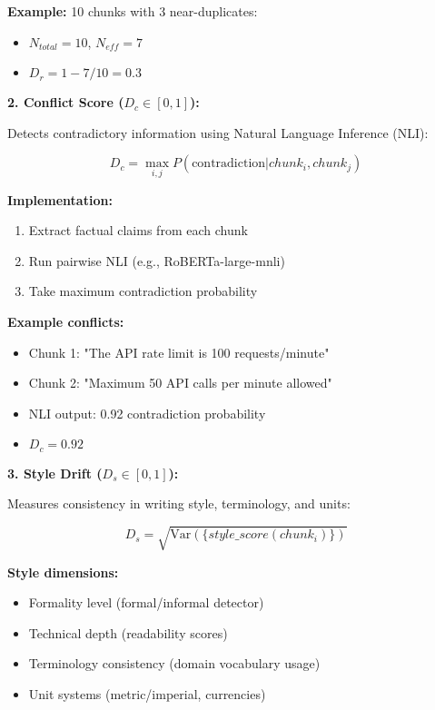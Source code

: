 \documentclass[conference]{IEEEtran}
\begin{document}
\textbf{Example:} 10 chunks with 3 near-duplicates:
\begin{itemize}
\item $N_{total} = 10$, $N_{eff} = 7$
\item $D_r = 1 - 7/10 = 0.3$
\end{itemize}

\textbf{2. Conflict Score ($D_c \in [0,1]$):}

Detects contradictory information using Natural Language Inference (NLI):

\begin{equation}
D_c = \max_{i,j} P(\text{contradiction} | chunk_i, chunk_j)
\end{equation}

\textbf{Implementation:}
\begin{enumerate}
\item Extract factual claims from each chunk
\item Run pairwise NLI (e.g., RoBERTa-large-mnli)
\item Take maximum contradiction probability
\end{enumerate}

\textbf{Example conflicts:}
\begin{itemize}
\item Chunk 1: "The API rate limit is 100 requests/minute"
\item Chunk 2: "Maximum 50 API calls per minute allowed"
\item NLI output: 0.92 contradiction probability
\item $D_c = 0.92$
\end{itemize}

\textbf{3. Style Drift ($D_s \in [0,1]$):}

Measures consistency in writing style, terminology, and units:

\begin{equation}
D_s = \sqrt{\text{Var}(\{style\_score(chunk_i)\})}
\end{equation}

\textbf{Style dimensions:}
\begin{itemize}
\item Formality level (formal/informal detector)
\item Technical depth (readability scores)
\item Terminology consistency (domain vocabulary usage)
\item Unit systems (metric/imperial, currencies)
\end{itemize}
\end{document}
